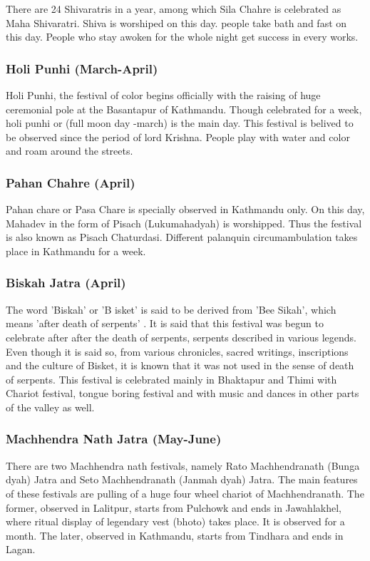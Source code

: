 \documentclass[a4paper,13pt, margin=0.9in]{article}
\begin{document}
\begin{flushleft}
	There are 24 Shivaratris in a year, among which Sila Chahre is celebrated as Maha Shivaratri. Shiva is worshiped on this day. people take bath and fast on this day. People who stay awoken for the whole night get success in every works.

	\subsubsection{Holi Punhi (March-April)}

	Holi Punhi, the festival of color begins officially with the raising of huge ceremonial pole at the Basantapur of Kathmandu. Though celebrated for a week, holi punhi or (full moon day -march) is the main day. This festival is belived to be observed since the period of lord Krishna. People play with water and color and roam around the streets.

	\subsubsection{Pahan Chahre (April)}

	Pahan chare or Pasa Chare is specially observed in Kathmandu only. On this day, Mahadev in the form of Pisach (Lukumahadyah) is worshipped. Thus the festival is also known as Pisach Chaturdasi. Different palanquin circumambulation takes place in Kathmandu for a week.

	\subsubsection{Biskah Jatra (April)}

	The word 'Biskah' or 'B isket' is said to be derived from 'Bee Sikah', which means 'after death of serpents' . It is said that this festival was begun to celebrate after after the death of serpents, serpents described in various legends. Even though it is said so, from various chronicles, sacred writings, inscriptions and the culture of Bisket, it is known that it was not used in the sense of death of serpents. This festival is celebrated mainly in Bhaktapur and Thimi with Chariot festival, tongue boring festival and with music and dances in other parts of the valley as well.

	\subsubsection{Machhendra Nath Jatra (May-June)}

	There are two Machhendra nath festivals, namely Rato Machhendranath (Bunga dyah) Jatra and Seto Machhendranath (Janmah dyah) Jatra. The main features of these festivals are pulling of a huge four wheel chariot of Machhendranath. The former, observed in Lalitpur, starts from Pulchowk and ends in Jawahlakhel, where ritual display of legendary vest (bhoto) takes place. It is observed for a month. The later, observed in Kathmandu, starts from Tindhara and ends in Lagan.


\end{flushleft}
\end{document}
